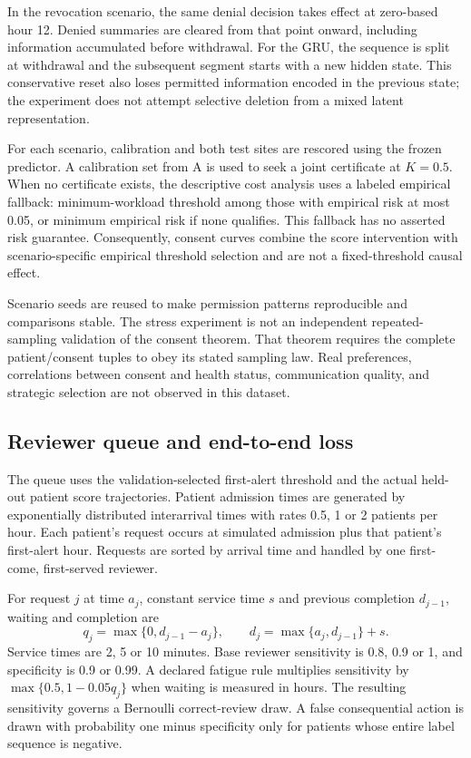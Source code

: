 In the revocation scenario, the same denial decision takes effect at zero-based hour 12. Denied summaries are cleared from that point onward, including information accumulated before withdrawal. For the GRU, the sequence is split at withdrawal and the subsequent segment starts with a new hidden state. This conservative reset also loses permitted information encoded in the previous state; the experiment does not attempt selective deletion from a mixed latent representation.

For each scenario, calibration and both test sites are rescored using the frozen predictor. A calibration set from A is used to seek a joint certificate at $K=0.5$. When no certificate exists, the descriptive cost analysis uses a labeled empirical fallback: minimum-workload threshold among those with empirical risk at most 0.05, or minimum empirical risk if none qualifies. This fallback has no asserted risk guarantee. Consequently, consent curves combine the score intervention with scenario-specific empirical threshold selection and are not a fixed-threshold causal effect.

Scenario seeds are reused to make permission patterns reproducible and comparisons stable. The stress experiment is not an independent repeated-sampling validation of the consent theorem. That theorem requires the complete patient/consent tuples to obey its stated sampling law. Real preferences, correlations between consent and health status, communication quality, and strategic selection are not observed in this dataset.

\subsection{Reviewer queue and end-to-end loss}
The queue uses the validation-selected first-alert threshold and the actual held-out patient score trajectories. Patient admission times are generated by exponentially distributed interarrival times with rates 0.5, 1 or 2 patients per hour. Each patient's request occurs at simulated admission plus that patient's first-alert hour. Requests are sorted by arrival time and handled by one first-come, first-served reviewer.

For request $j$ at time $a_j$, constant service time $s$ and previous completion $d_{j-1}$, waiting and completion are
\begin{equation}
 q_j=\max\{0,d_{j-1}-a_j\},\qquad
 d_j=\max\{a_j,d_{j-1}\}+s.
\end{equation}
Service times are 2, 5 or 10 minutes. Base reviewer sensitivity is 0.8, 0.9 or 1, and specificity is 0.9 or 0.99. A declared fatigue rule multiplies sensitivity by $\max\{0.5,1-0.05q_j\}$ when waiting is measured in hours. The resulting sensitivity governs a Bernoulli correct-review draw. A false consequential action is drawn with probability one minus specificity only for patients whose entire label sequence is negative.

